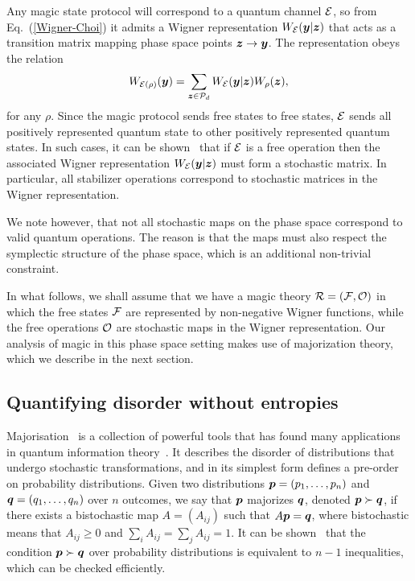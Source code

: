 \documentclass[pra,
aps,
twocolumn,
superscriptaddress,
groupedaddress,
nofootinbib,
reprint
]{revtex4-1}
\begin{document}
Any magic state protocol will correspond to a quantum channel ${\mathcal E}$, so from Eq.~(\ref{Wigner-Choi}) it admits a Wigner representation $W_{{\mathcal E}}(\boldsymbol{y} | \bm{z})$ that acts as a transition matrix mapping phase space points $\bm{z} \rightarrow \boldsymbol{y}$. The representation obeys the relation 
\begin{equation}
	W_{{\mathcal E}(\rho)} (\boldsymbol{y}) = \sum_{\bm{z} \in {\mathcal P}_d} W_{{\mathcal E}}( \boldsymbol{y} | \bm{z}) W_\rho(\bm{z}),
\end{equation}
for any $\rho$. Since the magic protocol sends free states to free states, ${\mathcal E}$ sends all positively represented quantum state to other positively represented quantum states. In such cases, it can be shown~\cite{Wang_2019} that if ${\mathcal E}$ is a free operation then the associated Wigner representation $W_{{\mathcal E}}(\boldsymbol{y} |\bm{z})$ must form a stochastic matrix. In particular, all stabilizer operations correspond to stochastic matrices in the Wigner representation. 

We note however, that not all stochastic maps on the phase space correspond to valid quantum operations. The reason is that the maps must also respect the symplectic structure of the phase space, which is an additional non-trivial constraint.

In what follows, we shall assume that we have a magic theory ${\mathcal R} = ({\mathcal F}, {\mathcal O})$ in which the free states ${\mathcal F}$ are represented by non-negative Wigner functions, while the free operations ${\mathcal O}$ are stochastic maps in the Wigner representation. Our analysis of magic in this phase space setting makes use of majorization theory, which we describe in the next section.



\subsection{Quantifying disorder without entropies}
\label{sec:major}

Majorisation~\cite{cit:marshall, Blackwell_1953} is a collection of powerful tools that has found many applications in quantum information theory~\cite{Nielsen_1999, cit:cwiklinski, cit:lostaglio2, cit:gour, cit:gour2, Horodecki_2003, Puchala_2013, Vallejos_2021}.
It describes the disorder of distributions that undergo stochastic transformations, and in its simplest form defines a pre-order on probability distributions. Given two distributions $\boldsymbol{p}= (p_1, \dots, p_n)$ and $\boldsymbol{q} = (q_1, \dots, q_n)$ over $n$ outcomes, we say that $\boldsymbol{p}$ majorizes $\boldsymbol{q}$, denoted $\boldsymbol{p} \succ \boldsymbol{q}$, if there exists a bistochastic map $A = (A_{ij})$ such that $A\boldsymbol{p} = \boldsymbol{q}$, where bistochastic means that $A_{ij} \geq 0$ and $\sum_i A_{ij} = \sum_j A_{ij} = 1$. It can be shown~\cite{cit:marshall} that the condition $ \boldsymbol{p} \succ \boldsymbol{q}$ over probability distributions is equivalent to $n-1$ inequalities, which can be checked efficiently.
\end{document}
